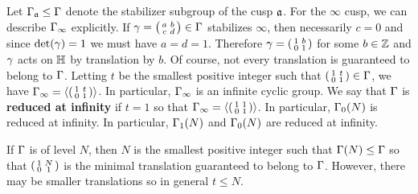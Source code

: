       Let $\Gamma_{\mathfrak{a}} \le \Gamma$ denote the stabilizer subgroup of the cusp $\mathfrak{a}$. For the $\infty$ cusp, we can describe $\Gamma_{\infty}$ explicitly. If $\gamma = \begin{psmallmatrix} a & b \\ c & d \end{psmallmatrix} \in \Gamma$ stabilizes $\infty$, then necessarily $c = 0$ and since $\det(\gamma) = 1$ we must have $a = d = 1$. Therefore $\gamma = \begin{psmallmatrix} 1 & b \\ 0 & 1 \end{psmallmatrix}$ for some $b \in \mathbb{Z}$ and $\gamma$ acts on $\mathbb{H}$ by translation by $b$. Of course, not every translation is guaranteed to belong to $\Gamma$. Letting $t$ be the smallest positive integer such that $\begin{psmallmatrix} 1 & t \\ 0 & 1 \end{psmallmatrix} \in \Gamma$, we have $\Gamma_{\infty} = \left\langle\begin{psmallmatrix} 1 & t \\ 0 & 1 \end{psmallmatrix}\right\rangle$. In particular, $\Gamma_{\infty}$ is an infinite cyclic group. We say that $\Gamma$ is \textbf{reduced at infinity} if $t = 1$ so that $\Gamma_{\infty} = \left\langle\begin{psmallmatrix} 1 & 1 \\ 0 & 1 \end{psmallmatrix}\right\rangle$. In particular, $\Gamma_{0}(N)$ is reduced at infinity. In particular, $\Gamma_{1}(N)$ and $\Gamma_{0}(N)$ are reduced at infinity.
      
      \begin{remark}
        If $\Gamma$ is of level $N$, then $N$ is the smallest positive integer such that $\Gamma(N) \le \Gamma$ so that $\begin{psmallmatrix} 1 & N \\ 0 & 1 \end{psmallmatrix}$ is the minimal translation guaranteed to belong to $\Gamma$. However, there may be smaller translations so in general $t \le N$.
      \end{remark}
      

